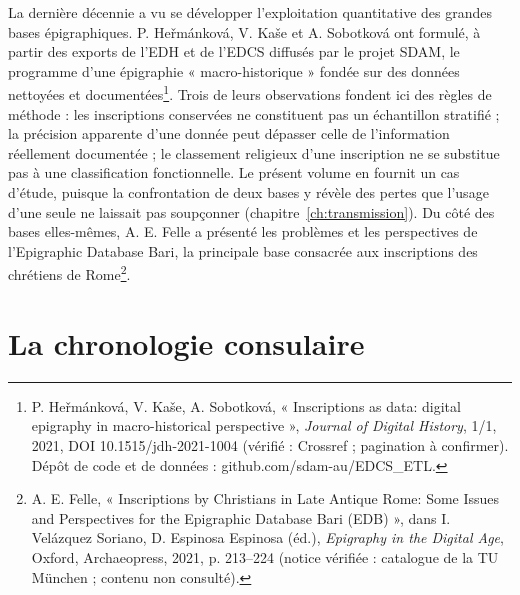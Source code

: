 La dernière décennie a vu se développer l’exploitation quantitative des grandes bases épigraphiques. P. Heřmánková, V. Kaše et A. Sobotková ont formulé, à partir des exports de l’EDH et de l’EDCS diffusés par le projet SDAM, le programme d’une épigraphie « macro-historique » fondée sur des données nettoyées et documentées\footnote{P. Heřmánková, V. Kaše, A. Sobotková, « Inscriptions as data: digital epigraphy in macro-historical perspective », \emph{Journal of Digital History}, 1/1, 2021, DOI 10.1515/jdh-2021-1004 (vérifié : Crossref ; pagination à confirmer). Dépôt de code et de données : github.com/sdam-au/EDCS\_ETL.}. Trois de leurs observations fondent ici des règles de méthode : les inscriptions conservées ne constituent pas un échantillon stratifié ; la précision apparente d’une donnée peut dépasser celle de l’information réellement documentée ; le classement religieux d’une inscription ne se substitue pas à une classification fonctionnelle. Le présent volume en fournit un cas d’étude, puisque la confrontation de deux bases y révèle des pertes que l’usage d’une seule ne laissait pas soupçonner (chapitre~\ref{ch:transmission}). Du côté des bases elles-mêmes, A. E. Felle a présenté les problèmes et les perspectives de l’Epigraphic Database Bari, la principale base consacrée aux inscriptions des chrétiens de Rome\footnote{A. E. Felle, « Inscriptions by Christians in Late Antique Rome: Some Issues and Perspectives for the Epigraphic Database Bari (EDB) », dans I. Velázquez Soriano, D. Espinosa Espinosa (éd.), \emph{Epigraphy in the Digital Age}, Oxford, Archaeopress, 2021, p. 213–224 (notice vérifiée : catalogue de la TU München ; contenu non consulté).}.

\section{La chronologie consulaire}

